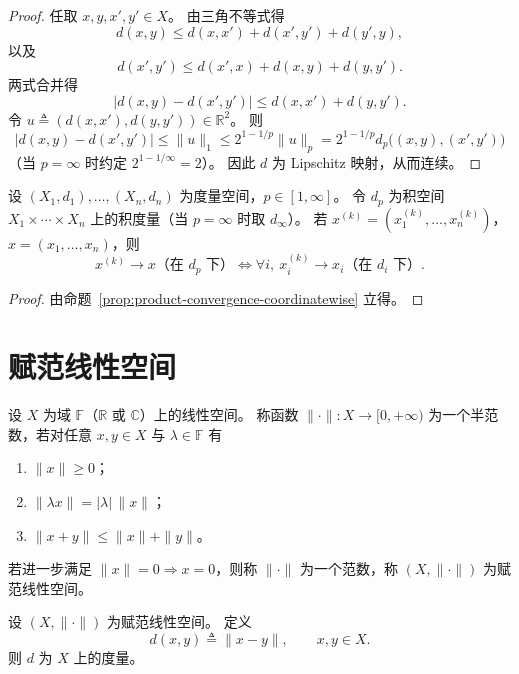 \documentclass[lang=cn,a4paper,newtx,section]{elegantbook}
\begin{document}
\begin{proof}
  任取 $x,y,x',y'\in X$。
  由三角不等式得
  \[
    d(x,y)\le d(x,x')+d(x',y')+d(y',y),
  \]
  以及
  \[
    d(x',y')\le d(x',x)+d(x,y)+d(y,y').
  \]
  两式合并得
  \[
    |d(x,y)-d(x',y')|\le d(x,x')+d(y,y').
  \]
  令 $u\triangleq(d(x,x'),d(y,y'))\in\mathbb{R}^2$。
  则
  \[
    |d(x,y)-d(x',y')|\le \|u\|_1\le 2^{1-1/p}\|u\|_p=2^{1-1/p}d_p\bigl((x,y),(x',y')\bigr)
  \]
  （当 $p=\infty$ 时约定 $2^{1-1/\infty}=2$）。
  因此 $d$ 为 Lipschitz 映射，从而连续。
\end{proof}

\begin{corollary}
  设 $(X_1,d_1),\dots,(X_n,d_n)$ 为度量空间，$p\in[1,\infty]$。
  令 $d_p$ 为积空间 $X_1\times\cdots\times X_n$ 上的积度量（当 $p=\infty$ 时取 $d_\infty$）。
  若 $x^{(k)}=(x_1^{(k)},\dots,x_n^{(k)})$，$x=(x_1,\dots,x_n)$，则
  \[
    x^{(k)}\to x\text{（在 }d_p\text{ 下）}
    \iff
    \forall i,\ x_i^{(k)}\to x_i\text{（在 }d_i\text{ 下）}.
  \]
\end{corollary}

\begin{proof}
  由命题~\ref{prop:product-convergence-coordinatewise} 立得。
\end{proof}

\section{赋范线性空间}

\begin{definition}
  设 $X$ 为域 $\mathbb{F}$（$\mathbb{R}$ 或 $\mathbb{C}$）上的线性空间。
  称函数 $\|\cdot\|:X\to[0,+\infty)$ 为一个半范数，若对任意 $x,y\in X$ 与 $\lambda\in\mathbb{F}$ 有
  \begin{enumerate}
    \item $\|x\|\ge0$；
    \item $\|\lambda x\|=|\lambda|\,\|x\|$；
    \item $\|x+y\|\le\|x\|+\|y\|$。
  \end{enumerate}
  若进一步满足 $\|x\|=0\Rightarrow x=0$，则称 $\|\cdot\|$ 为一个范数，称 $(X,\|\cdot\|)$ 为赋范线性空间。
\end{definition}

\begin{proposition}\label{prop:norm-induces-metric}
  设 $(X,\|\cdot\|)$ 为赋范线性空间。
  定义
  \[
    d(x,y)\triangleq\|x-y\|,\qquad x,y\in X.
  \]
  则 $d$ 为 $X$ 上的度量。
\end{proposition}
\end{document}

